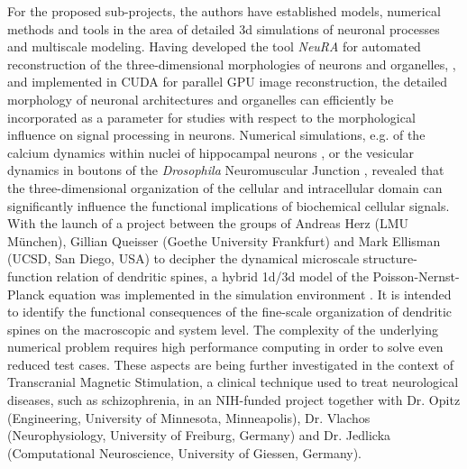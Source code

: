 For the proposed sub-projects, the authors have established models, numerical methods and tools in the area of detailed 3d simulations of neuronal processes and multiscale modeling. Having developed the tool \emph{NeuRA} for automated reconstruction of the three-dimensional morphologies of neurons and organelles, \cite{Jungblut2011}, and implemented in CUDA for parallel GPU image reconstruction, the detailed morphology of neuronal architectures and organelles can efficiently be incorporated as a parameter for studies with respect to the morphological influence on signal processing in neurons. Numerical simulations, e.g. of the calcium dynamics within nuclei of hippocampal neurons  \cite{Queisser2008, Wittmann2009}, or the vesicular dynamics in boutons of the \emph{Drosophila} Neuromuscular Junction \cite{Knodel2014}, revealed that the three-dimensional organization of the cellular and intracellular domain can significantly influence the functional implications of biochemical cellular signals. 
With the launch of a project between the groups of Andreas Herz (LMU M\"unchen), Gillian Queisser (Goethe University Frankfurt) and Mark Ellisman (UCSD, San Diego, USA) to decipher the dynamical microscale structure-function relation of dendritic spines, a hybrid 1d/3d model of the Poisson-Nernst-Planck equation was implemented in the simulation environment \ug \cite{Vogel2013, Heppner13}. It is intended to identify the functional consequences of the fine-scale organization of dendritic spines on the macroscopic and system level. The complexity of the underlying numerical problem requires high performance computing in order to solve even reduced test cases. 
These aspects are being further investigated in the context of Transcranial Magnetic Stimulation, a clinical technique used to treat neurological diseases, such as schizophrenia, in an NIH-funded project together with Dr. Opitz (Engineering, University of Minnesota, Minneapolis), Dr. Vlachos (Neurophysiology, University of Freiburg, Germany) and Dr. Jedlicka (Computational Neuroscience, University of Giessen, Germany). 
